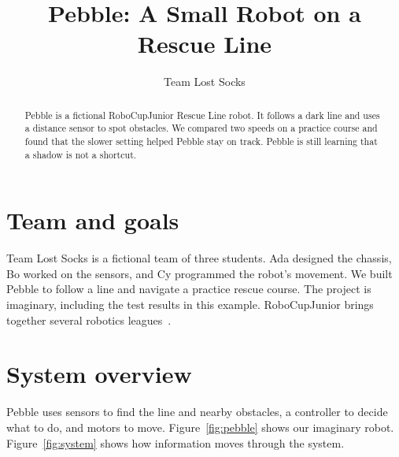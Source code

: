 \documentclass[runningheads]{llncs}
\title{Pebble: A Small Robot on a Rescue Line}
\author{Team Lost Socks}
\institute{The Imaginary Robotics Club \\ {Example Region}}
\begin{document}
\maketitle

\begin{abstract}
Pebble is a fictional RoboCupJunior Rescue Line robot. It follows a dark line
and uses a distance sensor to spot obstacles. We compared two speeds on a
practice course and found that the slower setting helped Pebble stay on track.
Pebble is still learning that a shadow is not a shortcut.

\end{abstract}

\section{Team and goals}
Team Lost Socks is a fictional team of three students. Ada designed the
chassis, Bo worked on the sensors, and Cy programmed the robot's movement.
We built Pebble to follow a line and navigate a practice rescue course.
The project is imaginary, including the test results in this example.
RoboCupJunior brings together several robotics leagues~\cite{rcj}.

\section{System overview}
Pebble uses sensors to find the line and nearby obstacles, a controller to
decide what to do, and motors to move. Figure~\ref{fig:pebble} shows our imaginary robot.
Figure~\ref{fig:system} shows how information moves through the system.
\end{document}
